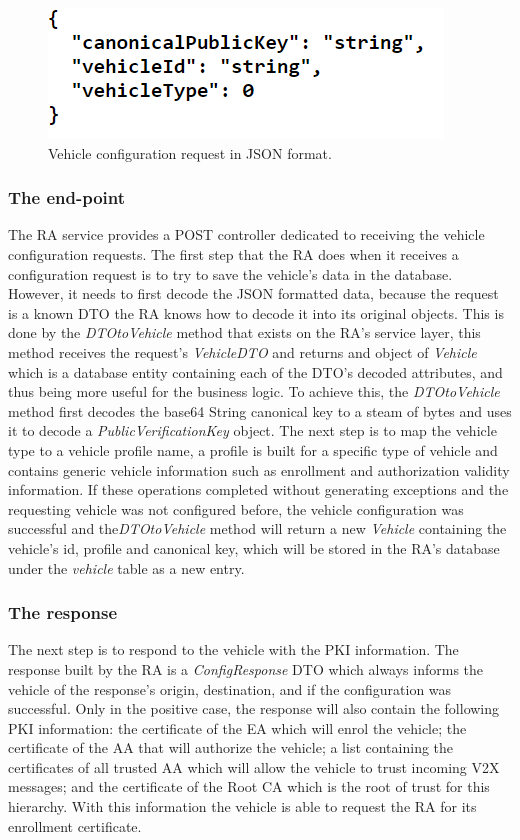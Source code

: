 \begin{figure}
	\centering
	\includegraphics[width=0.5
	\textwidth]{Figures/conf_req}
	\caption{\label{fig:conf_req}Vehicle configuration request in JSON format.}
\end{figure}

\subsubsection{The end-point}
The RA service provides a POST controller dedicated to receiving the vehicle configuration requests. The first step that the RA does when it receives a configuration request is to try to save the vehicle's data in the database. However, it needs to first decode the JSON formatted data, because the request is a known DTO the RA knows how to decode it into its original objects. This is done by the \textit{DTOtoVehicle} method that exists on the RA's service layer, this method receives the request's \textit{VehicleDTO} and returns and object of \textit{Vehicle} which is a database entity containing each of the DTO's decoded attributes, and thus being more useful for the business logic. To achieve this, the \textit{DTOtoVehicle} method first decodes the base64 String canonical key to a steam of bytes and uses it to decode a \textit{PublicVerificationKey} object. The next step is to map the vehicle type to a vehicle profile name, a profile is built for a specific type of vehicle and contains generic vehicle information such as enrollment and authorization validity information. If these operations completed without generating exceptions and the requesting vehicle was not configured before, the vehicle configuration was successful and the\textit{DTOtoVehicle} method will return a new \textit{Vehicle} containing the vehicle's id, profile and canonical key, which will be stored in the RA's database under the \textit{vehicle} table as a new entry. 

\subsubsection{The response}
The next step is to respond to the vehicle with the PKI information. The response built by the RA is a \textit{ConfigResponse} DTO which always informs the vehicle of the response's origin, destination, and if the configuration was successful. Only in the positive case, the response will also contain the following PKI information: the certificate of the EA which will enrol the vehicle; the certificate of the AA that will authorize the vehicle; a list containing the certificates of all trusted AA which will allow the vehicle to trust incoming V2X messages; and the certificate of the Root CA which is the root of trust for this hierarchy. With this information the vehicle is able to request the RA for its enrollment certificate. 


